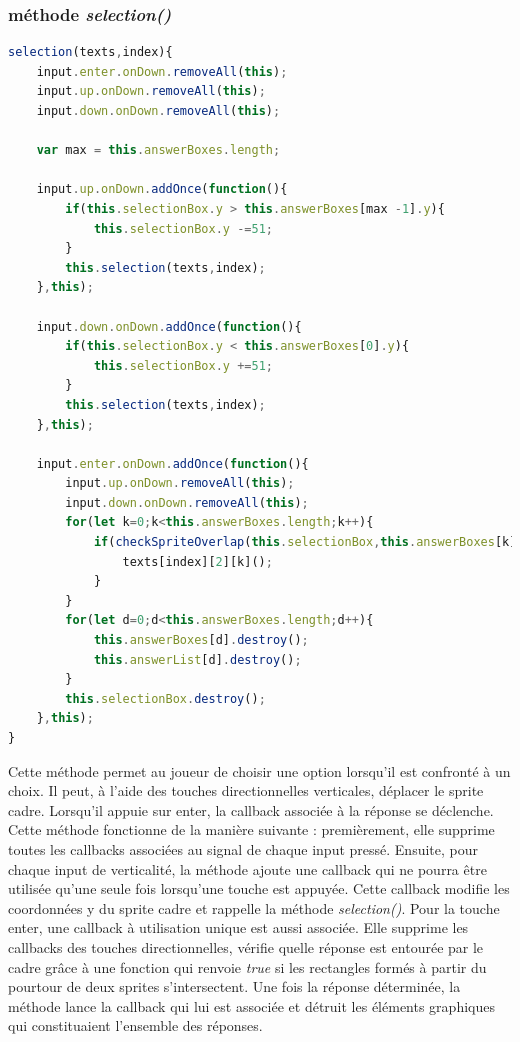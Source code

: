 \documentclass[11pt]{article}
\begin{document}
\subsubsection{méthode \textit{selection()}}
\begin{lstlisting}[language=JavaScript]
selection(texts,index){
    input.enter.onDown.removeAll(this);
    input.up.onDown.removeAll(this);
    input.down.onDown.removeAll(this);
    
    var max = this.answerBoxes.length;
    
    input.up.onDown.addOnce(function(){
        if(this.selectionBox.y > this.answerBoxes[max -1].y){
            this.selectionBox.y -=51;
        }
        this.selection(texts,index);
    },this);
    
    input.down.onDown.addOnce(function(){
        if(this.selectionBox.y < this.answerBoxes[0].y){
            this.selectionBox.y +=51;
        }
        this.selection(texts,index);
    },this);
    
    input.enter.onDown.addOnce(function(){
        input.up.onDown.removeAll(this);
        input.down.onDown.removeAll(this);
        for(let k=0;k<this.answerBoxes.length;k++){
            if(checkSpriteOverlap(this.selectionBox,this.answerBoxes[k])){
                texts[index][2][k]();
            }
        }
        for(let d=0;d<this.answerBoxes.length;d++){
            this.answerBoxes[d].destroy();
            this.answerList[d].destroy();
        }
        this.selectionBox.destroy();
    },this);
}
\end{lstlisting} 
Cette méthode permet au joueur de choisir une option lorsqu'il est confronté à un choix. Il peut, à l'aide des touches directionnelles verticales,  déplacer le sprite cadre. Lorsqu'il appuie sur enter, la callback associée à la réponse se déclenche. \\

Cette méthode fonctionne  de la manière suivante : premièrement, elle supprime toutes les callbacks associées au signal de chaque input pressé. Ensuite, pour chaque input de verticalité, la méthode ajoute une callback qui ne pourra être utilisée qu'une seule fois lorsqu'une touche est appuyée. Cette callback modifie les coordonnées y du sprite cadre et rappelle la méthode \textit{selection()}. Pour la touche enter, une callback à utilisation unique est aussi associée. Elle supprime les callbacks des touches directionnelles, vérifie quelle réponse est entourée par le cadre grâce à une fonction qui renvoie \textit{true} si les rectangles formés à partir du pourtour de deux sprites s'intersectent. Une fois la réponse déterminée, la méthode lance la callback qui lui est associée et détruit les éléments graphiques qui constituaient l'ensemble des réponses.
\end{document}
